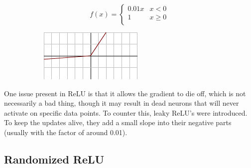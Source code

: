 \begin{figure}[H]
\raggedright
\begin{subfigure}{.38\textwidth}
  \centering
  \[
f(x) = \begin{cases}
       0.01x & x < 0 \\
       1 & x \geq 0 \\
     \end{cases} \]  
\end{subfigure}%
\begin{subfigure}{.25\textwidth}
  \centering
  \includegraphics[width=\textwidth]{tex/images/activation/lrelu}
\end{subfigure}
\end{figure}

\noindent
One issue present in ReLU is that it allows the gradient to die off, which is not necessarily a bad thing, though it may result in dead neurons that will never activate on specific data points. To counter this, leaky ReLU's were introduced. To keep the updates alive, they add a small slope into their negative parts (usually with the factor of around 0.01).
   
\subsection*{Randomized ReLU}

